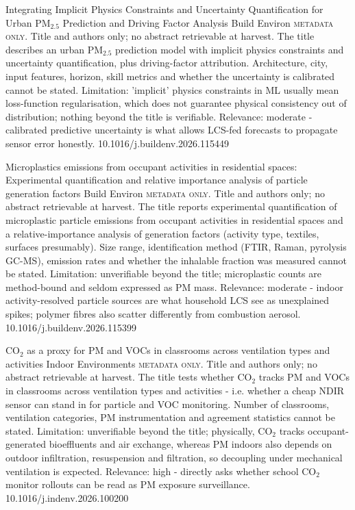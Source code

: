 \documentclass[10pt]{article}
\begin{document}
{Integrating Implicit Physics Constraints and Uncertainty Quantification for Urban PM$_{2.5}$ Prediction and Driving Factor Analysis}
{Build Environ}
{\textsc{metadata only.} Title and authors only; no abstract retrievable at harvest. The title describes an urban PM$_{2.5}$ prediction model with implicit physics constraints and uncertainty quantification, plus driving-factor attribution. Architecture, city, input features, horizon, skill metrics and whether the uncertainty is calibrated cannot be stated. Limitation: 'implicit' physics constraints in ML usually mean loss-function regularisation, which does not guarantee physical consistency out of distribution; nothing beyond the title is verifiable. Relevance: moderate - calibrated predictive uncertainty is what allows LCS-fed forecasts to propagate sensor error honestly.}
{10.1016/j.buildenv.2026.115449}

\par{}\baselineskip{}\baselineskip
{}

{Microplastics emissions from occupant activities in residential spaces: Experimental quantification and relative importance analysis of particle generation factors}
{Build Environ}
{\textsc{metadata only.} Title and authors only; no abstract retrievable at harvest. The title reports experimental quantification of microplastic particle emissions from occupant activities in residential spaces and a relative-importance analysis of generation factors (activity type, textiles, surfaces presumably). Size range, identification method (FTIR, Raman, pyrolysis GC-MS), emission rates and whether the inhalable fraction was measured cannot be stated. Limitation: unverifiable beyond the title; microplastic counts are method-bound and seldom expressed as PM mass. Relevance: moderate - indoor activity-resolved particle sources are what household LCS see as unexplained spikes; polymer fibres also scatter differently from combustion aerosol.}
{10.1016/j.buildenv.2026.115399}

{CO$_2$ as a proxy for PM and VOCs in classrooms across ventilation types and activities}
{Indoor Environments}
{\textsc{metadata only.} Title and authors only; no abstract retrievable at harvest. The title tests whether CO$_2$ tracks PM and VOCs in classrooms across ventilation types and activities - i.e. whether a cheap NDIR sensor can stand in for particle and VOC monitoring. Number of classrooms, ventilation categories, PM instrumentation and agreement statistics cannot be stated. Limitation: unverifiable beyond the title; physically, CO$_2$ tracks occupant-generated bioeffluents and air exchange, whereas PM indoors also depends on outdoor infiltration, resuspension and filtration, so decoupling under mechanical ventilation is expected. Relevance: high - directly asks whether school CO$_2$ monitor rollouts can be read as PM exposure surveillance.}
{10.1016/j.indenv.2026.100200}
\end{document}
